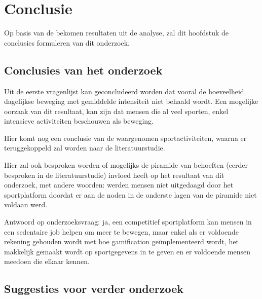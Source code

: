 
\chapter{Conclusie}%
\label{ch:conclusie}

Op basis van de bekomen resultaten uit de analyse, zal dit hoofdstuk de conclusies formuleren van dit onderzoek.


\section{Conclusies van het onderzoek}

Uit de eerste vragenlijst kan geconcludeerd worden dat vooral de hoeveelheid dagelijkse beweging met gemiddelde intensiteit niet behaald wordt. Een mogelijke oorzaak van dit resultaat, kan zijn dat mensen die al veel sporten, enkel intensieve activiteiten beschouwen als beweging.

Hier komt nog een conclusie van de waargenomen sportactiviteiten, waarna er teruggekoppeld zal worden naar de literatuurstudie.

Hier zal ook besproken worden of mogelijks de piramide van behoeften (eerder besproken in de literatuurstudie) invloed heeft op het resultaat van dit onderzoek, met andere woorden: werden mensen niet uitgedaagd door het sportplatform doordat er aan de noden in de onderste lagen van de piramide niet voldaan werd.

Antwoord op onderzoeksvraag: ja, een competitief sportplatform kan mensen in een sedentaire job helpen om meer te bewegen, maar enkel als
er voldoende rekening gehouden wordt met hoe gamification geïmplementeerd wordt,
het makkelijk gemaakt wordt op sportgegevens in te geven en er voldoende mensen meedoen die elkaar kennen.

\section{Suggesties voor verder onderzoek}

